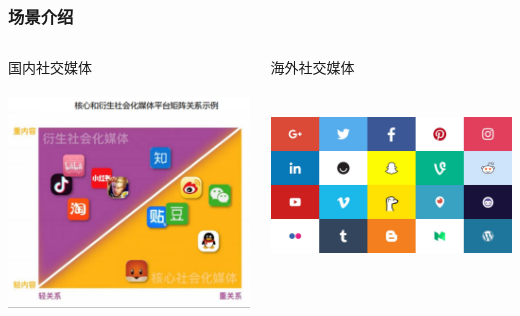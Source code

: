 \documentclass[../Postbot.tex]{subfiles}
\begin{document}
    \begin{frame}
        \frametitle{场景介绍}
        \begin{columns}
            \begin{column}{.4\linewidth}
                国内社交媒体 \\
                \hspace*{\fill} \\
                \includegraphics[scale=0.2]{../src/img/Social_media_mainland.png}

            \end{column}
            \begin{column}{.4\linewidth}
                海外社交媒体 \\
                \hspace*{\fill} \\
                \hspace*{\fill} \\
                \includegraphics[scale=0.07]{../src/img/Social_media_oversea.jpg}

            \end{column}
        \end{columns}
    \end{frame}
\end{document}
